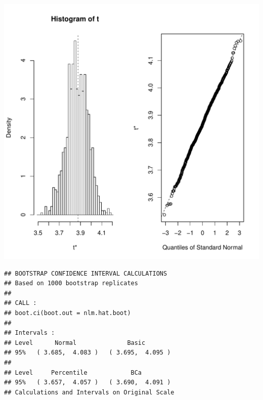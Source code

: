 \begin{knitrout}
\includegraphics[width=\maxwidth]{figure/Test-1}
\begin{kframe}\begin{alltt}
\end{alltt}


{\ttfamily\noindent\color{warningcolor}{\#\# Warning in boot.ci(nlm.hat.boot): bootstrap variances needed for studentized intervals}}\begin{verbatim}
## BOOTSTRAP CONFIDENCE INTERVAL CALCULATIONS
## Based on 1000 bootstrap replicates
##
## CALL :
## boot.ci(boot.out = nlm.hat.boot)
##
## Intervals :
## Level      Normal              Basic
## 95%   ( 3.685,  4.083 )   ( 3.695,  4.095 )
##
## Level     Percentile            BCa
## 95%   ( 3.657,  4.057 )   ( 3.690,  4.091 )
## Calculations and Intervals on Original Scale
\end{verbatim}
\end{kframe}
\end{knitrout}

